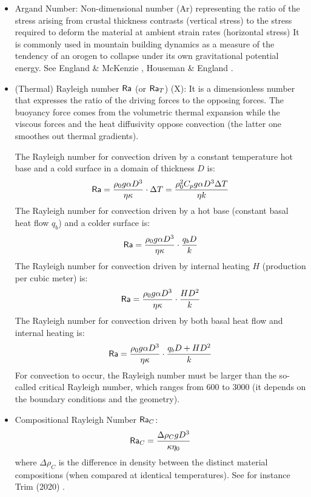 \begin{itemize}
\item {\color{violet} Argand Number}: 
Non-dimensional number (Ar) representing the ratio of the stress arising 
from crustal thickness
contrasts (vertical stress) to the stress required to deform
the material at ambient strain rates (horizontal stress)
It is commonly used in mountain building
dynamics as a measure of the tendency of an orogen to
collapse under its own gravitational potential energy.
See England \& McKenzie \cite{enmc82}, Houseman \& England \cite{hoen86a}.

\item {\color{violet} (Thermal) Rayleigh number} ${\mathsf{Ra}}$ (or ${\mathsf{Ra}}_T$) (X): 
It is a dimensionless number that expresses the	ratio of the driving forces to the opposing forces.
The buoyancy force comes from the volumetric thermal expansion while the viscous forces and 
the heat diffusivity oppose convection (the latter one smoothes out thermal gradients). 

The Rayleigh number for convection driven by a constant temperature hot base and a cold surface
in a domain of thickness $D$ is:
\[
{\mathsf{Ra}} 
= \frac{\rho_0 g \alpha D^3 }{\eta \kappa}  \cdot  \Delta T
= \frac{\rho_0^2 C_p g \alpha D^3 \Delta T}{\eta k}
\]
The Rayleigh number for convection driven by a hot base (constant basal heat flow $q_b$)
and a colder surface is:
\[
{\mathsf{Ra}} = \frac{\rho_0 g \alpha D^3}{\eta \kappa } \cdot  \frac{q_b D}{k}
\]  
The Rayleigh number for convection driven by internal heating $H$ (production per cubic meter) is:
\[
{\mathsf{Ra}} = \frac{\rho_0 g \alpha D^3}{\eta \kappa} \cdot  \frac{H D^2}{k }
\]
The Rayleigh number for convection driven by both basal heat flow and internal heating is:	
\[
{\mathsf{Ra}} = \frac{\rho_0 g \alpha D^3}{\eta \kappa} \cdot  \frac{q_b D + H D^2}{k }
\]
For convection to occur, the Rayleigh number must be larger than the so-called critical 
Rayleigh number, which ranges from 600 to 3000 (it depends on the boundary conditions and the 
geometry).

\item {\color{violet}Compositional Rayleigh Number} ${\mathsf{Ra}}_C$:  
\[
{\mathsf{Ra}}_C= \frac{\Delta \rho_C  g  D^3}{\kappa \eta_0}
\]
where $\Delta \rho_C$ is the difference in density between the distinct material compositions
(when compared at identical temperatures). See for instance Trim \etal (2020) \cite{trlb20}.


\end{itemize}

